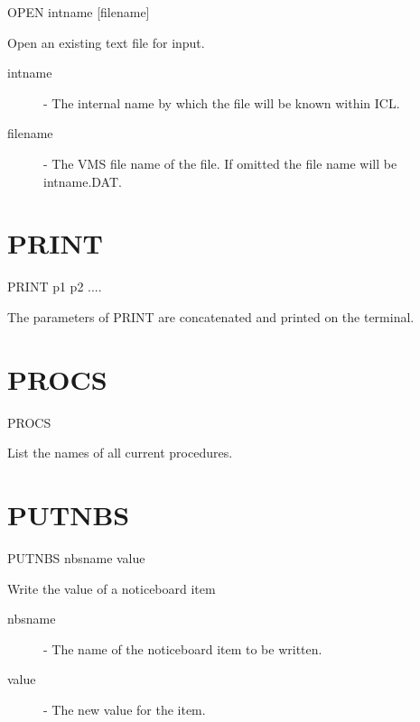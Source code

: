 \documentclass[twoside,11pt]{report}
\newcommand{\xlabel}[1]{}
\begin{document}
   OPEN \hspace{.5cm} intname \hspace{.5cm} [filename]

 Open an existing text file for input.

\begin{description}

\item[intname]  -  The internal name by which the file will be known
                  within ICL.

\item[filename]  -  The VMS file name of the file. If omitted the
                  file name will be intname.DAT.

\end{description}

\section{\xlabel{PRINT}PRINT\label{PRINT}}

    PRINT  \hspace{.5cm}  p1 \hspace{.5cm} p2  ....

 The parameters of PRINT are concatenated and printed on the terminal.

\section{\xlabel{PROCS}PROCS\label{PROCS}}

    PROCS

 List the names of all current procedures.

\section{\xlabel{PUTNBS}PUTNBS\label{PUTNBS}}

   PUTNBS \hspace{.5cm}  nbsname \hspace{.5cm} value

Write the value of a noticeboard item

\begin{description}

\item[nbsname] - The name of the noticeboard item to be written.

\item[value] - The new value for the item.

\end{description}
\end{document}
